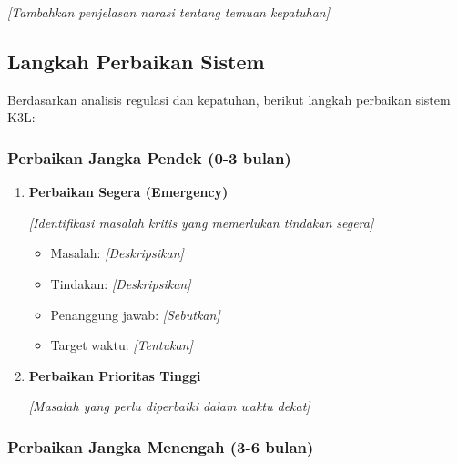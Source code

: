 \textit{[Tambahkan penjelasan narasi tentang temuan kepatuhan]}

\vspace{1cm}

\subsection{Langkah Perbaikan Sistem}
\label{subsec:perbaikan-sistem}


Berdasarkan analisis regulasi dan kepatuhan, berikut langkah perbaikan sistem K3L:

\subsubsection{Perbaikan Jangka Pendek (0-3 bulan)}

\begin{enumerate}
    \item \textbf{Perbaikan Segera (Emergency)}
    
    \textit{[Identifikasi masalah kritis yang memerlukan tindakan segera]}
    
    \begin{itemize}
        \item Masalah: \textit{[Deskripsikan]}
        \item Tindakan: \textit{[Deskripsikan]}
        \item Penanggung jawab: \textit{[Sebutkan]}
        \item Target waktu: \textit{[Tentukan]}
    \end{itemize}
    
    \item \textbf{Perbaikan Prioritas Tinggi}
    
    \textit{[Masalah yang perlu diperbaiki dalam waktu dekat]}
\end{enumerate}

\vspace{0.5cm}

\subsubsection{Perbaikan Jangka Menengah (3-6 bulan)}

